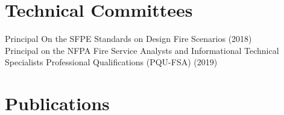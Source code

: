 \documentclass[10pt,letterpaper]{article}
\begin{document}
\section*{Technical Committees}

Principal On the SFPE Standards on Design Fire Scenarios (2018) \\
Principal on the NFPA Fire Service Analysts and Informational Technical Specialists Professional Qualifications (PQU-FSA) (2019) \\

\clearpage

\section*{Publications}

\nocite{*}
\printbibliography[title=Journal Articles, type=article]
\printbibliography[title=Peer Reviewed Technical Reports, type=report]
\printbibliography[title=In Proceedings, type=inproceedings]

\clearpage
\end{document}
